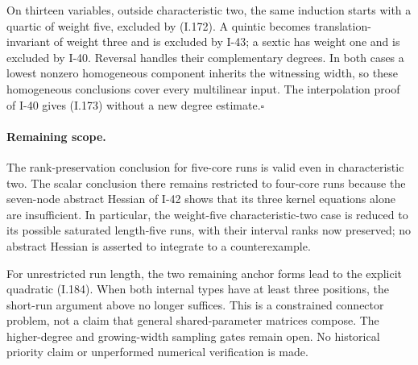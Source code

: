On thirteen variables, outside characteristic two, the
same induction starts with a quartic of weight five,
excluded by (I.172). A quintic becomes translation-invariant
of weight three and is excluded by I-43; a sextic has
weight one and is excluded by I-40. Reversal handles their
complementary degrees. In both cases a lowest nonzero
homogeneous component inherits the witnessing width,
so these homogeneous conclusions cover every multilinear
input. The interpolation proof of I-40 gives (I.173)
without a new degree estimate.\hfill$\square$

\paragraph{Remaining scope.}
The rank-preservation conclusion for five-core runs is
valid even in characteristic two. The scalar conclusion
there remains restricted to four-core runs because the
seven-node abstract Hessian of I-42 shows that its three
kernel equations alone are insufficient. In particular,
the weight-five characteristic-two case is reduced to its
possible saturated length-five runs, with their interval
ranks now preserved; no abstract Hessian is asserted to
integrate to a counterexample.

For unrestricted run length, the two remaining anchor forms
lead to the explicit quadratic (I.184). When both internal
types have at least three positions, the short-run argument
above no longer suffices. This is a constrained connector
problem, not a claim that general shared-parameter matrices
compose. The higher-degree and growing-width sampling gates
remain open. No historical priority claim or unperformed
numerical verification is made.
